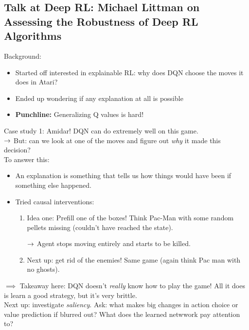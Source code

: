 


\subsection{Talk at Deep RL: Michael Littman on Assessing the Robustness of Deep RL Algorithms}

Background:
\begin{itemize}
    \item Started off interested in explainable RL: why does DQN choose the moves it does in Atari?
    
    \item Ended up wondering if any explanation at all is possible
    \item {\bf Punchline:} Generalizing Q values is hard!\cite{witty2018measuring}
\end{itemize}

Case study 1: Amidar! DQN can do extremely well on this game. \\

$\rightarrow$ But: can we look at one of the moves and figure out {\it why} it made this decision? \\

To answer this:
\begin{itemize}
    \item An explanation is something that tells us how things would have been if something else happened.
    \item Tried causal interventions:
    \begin{enumerate}
        \item Idea one: Prefill one of the boxes! Think Pac-Man with some random pellets missing (couldn't have reached the state).
        
        $\rightarrow$ Agent stops moving entirely and starts to be killed.
        
        \item Next up: get rid of the enemies! Same game (again think Pac man with no ghosts).
    \end{enumerate}
\end{itemize}

$\implies$ Takeaway here: DQN doesn't {\it really} know how to play the game! All it does is learn a good strategy, but it's very brittle. \\

Next up: investigate {\it saliency}. Ask: what makes big changes in action choice or value prediction if blurred out? What does the learned netwwork pay attention to? \\

